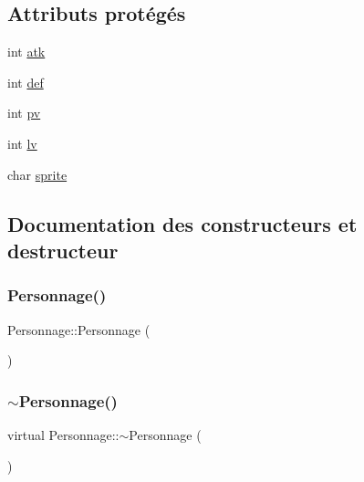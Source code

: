 \subsection*{Attributs protégés}
\begin{DoxyCompactItemize}
\item 
int \hyperlink{classPersonnage_a3bd76731e947c742ffed6644f24c6522}{atk}
\item 
int \hyperlink{classPersonnage_ad44462ce4fe58ea7f28cfbaa34abb796}{def}
\item 
int \hyperlink{classPersonnage_a83d1d606a4a8b60d1de8bb1791f91f75}{pv}
\item 
int \hyperlink{classPersonnage_a21b991a0a2b78a1ef794b0760c5c12d8}{lv}
\item 
char \hyperlink{classPersonnage_a2fa6fd670bd0b44a32971d7de3c2609a}{sprite}
\end{DoxyCompactItemize}


\subsection{Documentation des constructeurs et destructeur}
\mbox{\label{classPersonnage_abec36eb0310adc71f3375297fc590c65}} 
\subsubsection{\texorpdfstring{Personnage()}{Personnage()}}
{\footnotesize\ttfamily Personnage\+::\+Personnage (\begin{DoxyParamCaption}{ }\end{DoxyParamCaption})}

\mbox{\label{classPersonnage_ac2d42c52a39502e915c82081a7c056f6}} 
\subsubsection{\texorpdfstring{$\sim$\+Personnage()}{~Personnage()}}
{\footnotesize\ttfamily virtual Personnage\+::$\sim$\+Personnage (\begin{DoxyParamCaption}{ }\end{DoxyParamCaption})\hspace{0.3cm}{\ttfamily [virtual]}}




